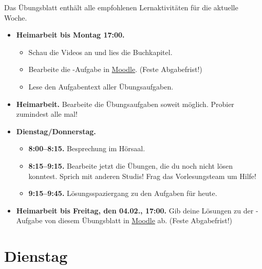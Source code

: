 \documentclass{uebung_cs}
\begin{document}
Das Übungsblatt enthält alle empfohlenen Lernaktivitäten für die aktuelle Woche.

\begin{itemize}
\item \textbf{Heimarbeit bis Montag 17:00.}
    \begin{itemize}
    \item 
    Schau die Videos an und lies die Buchkapitel.
    \item Bearbeite die -Aufgabe in \href{https://moodle.studiumdigitale.uni-frankfurt.de/moodle/course/view.php?id=2241}{Moodle}. (Feste Abgabefrist!)
    \item Lese den Aufgabentext aller Übungsaufgaben.
    \end{itemize}
\item \textbf{Heimarbeit.} Bearbeite die Übungsaufgaben soweit möglich. Probier zumindest alle mal!
\item \textbf{Dienstag/Donnerstag.}
\begin{itemize}
    \item \textbf{8:00--8:15.} Besprechung im Hörsaal.
    \item \textbf{8:15--9:15.} Bearbeite jetzt die Übungen, die du noch nicht lösen konntest. Sprich mit anderen Studis! Frag das Vorlesungsteam um Hilfe!
    \item \textbf{9:15--9:45.} Lösungsspaziergang zu den Aufgaben für heute.
\end{itemize}

\item \textbf{Heimarbeit bis Freitag, den 04.02., 17:00.} Gib deine Lösungen zu der -Aufgabe von diesem Übungsblatt in \href{https://moodle.studiumdigitale.uni-frankfurt.de/moodle/course/view.php?id=2241}{Moodle} ab. (Feste Abgabefrist!)
\end{itemize}

\section*{Dienstag}
\end{document}
